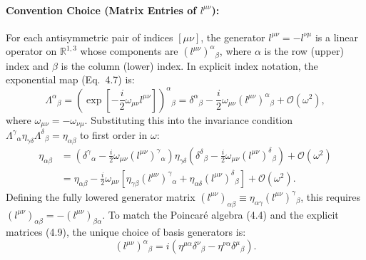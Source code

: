\documentclass[11pt,a4paper]{article}
\begin{document}
\paragraph{Convention Choice (Matrix Entries of $l^{\mu\nu}$):}
For each antisymmetric pair of indices $[\mu\nu]$, the generator $l^{\mu\nu} = -l^{\nu\mu}$ is a linear operator on $\mathbb{R}^{1,3}$ whose components are $(l^{\mu\nu})^\alpha{}_\beta$, where $\alpha$ is the row (upper) index and $\beta$ is the column (lower) index. In explicit index notation, the exponential map (Eq.~4.7) is:
\begin{equation}
    \Lambda^\alpha{}_\beta = \left(\exp\left[-\frac{i}{2}\omega_{\mu\nu}l^{\mu\nu}\right]\right)^\alpha{}_\beta = \delta^\alpha{}_\beta - \frac{i}{2}\omega_{\mu\nu}(l^{\mu\nu})^\alpha{}_\beta + \mathcal{O}(\omega^2),
\end{equation}
where $\omega_{\mu\nu} = -\omega_{\nu\mu}$. Substituting this into the invariance condition $\Lambda^\gamma{}_\alpha \eta_{\gamma\delta} \Lambda^\delta{}_\beta = \eta_{\alpha\beta}$ to first order in $\omega$:
\begin{align}
    \eta_{\alpha\beta} &= \left(\delta^\gamma{}_\alpha - \frac{i}{2}\omega_{\mu\nu}(l^{\mu\nu})^\gamma{}_\alpha\right)\eta_{\gamma\delta}\left(\delta^\delta{}_\beta - \frac{i}{2}\omega_{\mu\nu}(l^{\mu\nu})^\delta{}_\beta\right) + \mathcal{O}(\omega^2) \nonumber \\
    &= \eta_{\alpha\beta} - \frac{i}{2}\omega_{\mu\nu}\left[\eta_{\gamma\beta}(l^{\mu\nu})^\gamma{}_\alpha + \eta_{\alpha\delta}(l^{\mu\nu})^\delta{}_\beta\right] + \mathcal{O}(\omega^2).
\end{align}
Defining the fully lowered generator matrix $(l^{\mu\nu})_{\alpha\beta} \equiv \eta_{\alpha\gamma}(l^{\mu\nu})^\gamma{}_\beta$, this requires $(l^{\mu\nu})_{\alpha\beta} = -(l^{\mu\nu})_{\beta\alpha}$. To match the Poincar\'e algebra (4.4) and the explicit matrices (4.9), the unique choice of basis generators is:
\begin{equation}
    (l^{\mu\nu})^\alpha{}_\beta = i\left(\eta^{\mu\alpha}\delta^\nu{}_\beta - \eta^{\nu\alpha}\delta^\mu{}_\beta\right).
\end{equation}
\end{document}
